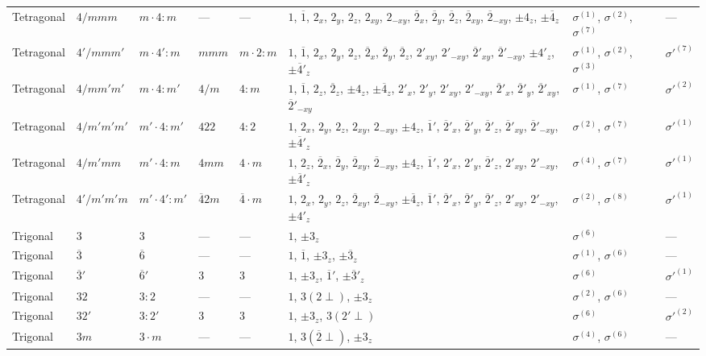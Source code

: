 \documentclass[a4paper,11pt]{article}
\newcommand{\ob}[1]{\overline{#1}}
\newcommand{\sg}[1]{\sigma^{(#1)}}
\newcommand{\sgp}[1]{\sigma'^{(#1)}}
\begin{document}
\begin{landscape}
\begin{longtable}{l l l l l p{9.5cm} l l}
Tetragonal & $4/mmm$ & $m{\cdot}4{:}m$ & --- & --- & $1$, $\ob{1}$, $2_x$, $2_y$, $2_z$, $2_{xy}$, $2_{-xy}$, $\ob{2}_x$, $\ob{2}_y$, $\ob{2}_z$, $\ob{2}_{xy}$, $\ob{2}_{-xy}$, $\pm 4_z$, $\pm\ob{4}_z$ & $\sg{1}$, $\sg{2}$, $\sg{7}$ & --- \\
Tetragonal & $4'/mmm'$ & $m{\cdot}4'{:}m$ & $mmm$ & $m{\cdot}2{:}m$ & $1$, $\ob{1}$, $2_x$, $2_y$, $2_z$, $\ob{2}_x$, $\ob{2}_y$, $\ob{2}_z$, $2'_{xy}$, $2'_{-xy}$, $\ob{2}'_{xy}$, $\ob{2}'_{-xy}$, $\pm 4'_z$, $\pm\ob{4}'_z$ & $\sg{1}$, $\sg{2}$, $\sg{3}$ & $\sgp{7}$ \\
Tetragonal & $4/mm'm'$ & $m{\cdot}4{:}m'$ & $4/m$ & $4{:}m$ & $1$, $\ob{1}$, $2_z$, $\ob{2}_z$, $\pm 4_z$, $\pm\ob{4}_z$, $2'_x$, $2'_y$, $2'_{xy}$, $2'_{-xy}$, $\ob{2}'_x$, $\ob{2}'_y$, $\ob{2}'_{xy}$, $\ob{2}'_{-xy}$ & $\sg{1}$, $\sg{7}$ & $\sgp{2}$ \\
Tetragonal & $4/m'm'm'$ & $m'{\cdot}4{:}m'$ & $422$ & $4{:}2$ & $1$, $2_x$, $2_y$, $2_z$, $2_{xy}$, $2_{-xy}$, $\pm 4_z$, $\ob{1}'$, $\ob{2}'_x$, $\ob{2}'_y$, $\ob{2}'_z$, $\ob{2}'_{xy}$, $\ob{2}'_{-xy}$, $\pm\ob{4}'_z$ & $\sg{2}$, $\sg{7}$ & $\sgp{1}$ \\
Tetragonal & $4/m'mm$ & $m'{\cdot}4{:}m$ & $4mm$ & $4{\cdot}m$ & $1$, $2_z$, $\ob{2}_x$, $\ob{2}_y$, $\ob{2}_{xy}$, $\ob{2}_{-xy}$, $\pm 4_z$, $\ob{1}'$, $2'_x$, $2'_y$, $\ob{2}'_z$, $2'_{xy}$, $2'_{-xy}$, $\pm\ob{4}'_z$ & $\sg{4}$, $\sg{7}$ & $\sgp{1}$ \\
Tetragonal & $4'/m'm'm$ & $m'{\cdot}4'{:}m'$ & $\ob{4}2m$ & $\ob{4}{\cdot}m$ & $1$, $2_x$, $2_y$, $2_z$, $\ob{2}_{xy}$, $\ob{2}_{-xy}$, $\pm\ob{4}_z$, $\ob{1}'$, $\ob{2}'_x$, $\ob{2}'_y$, $\ob{2}'_z$, $2'_{xy}$, $2'_{-xy}$, $\pm 4'_z$ & $\sg{2}$, $\sg{8}$ & $\sgp{1}$ \\
\addlinespace
Trigonal & $3$ & $3$ & --- & --- & $1$, $\pm 3_z$ & $\sg{6}$ & --- \\
Trigonal & $\ob{3}$ & $\ob{6}$ & --- & --- & $1$, $\ob{1}$, $\pm 3_z$, $\pm\ob{3}_z$ & $\sg{1}$, $\sg{6}$ & --- \\
Trigonal & $\ob{3}'$ & $\ob{6}'$ & $3$ & $3$ & $1$, $\pm 3_z$, $\ob{1}'$, $\pm\ob{3}'_z$ & $\sg{6}$ & $\sgp{1}$ \\
Trigonal & $32$ & $3{:}2$ & --- & --- & $1$, $3(2{\perp})$, $\pm 3_z$ & $\sg{2}$, $\sg{6}$ & --- \\
Trigonal & $32'$ & $3{:}2'$ & $3$ & $3$ & $1$, $\pm 3_z$, $3(2'{\perp})$ & $\sg{6}$ & $\sgp{2}$ \\
Trigonal & $3m$ & $3{\cdot}m$ & --- & --- & $1$, $3(\ob{2}{\perp})$, $\pm 3_z$ & $\sg{4}$, $\sg{6}$ & --- \\

\end{longtable}
\end{landscape}
\end{document}
